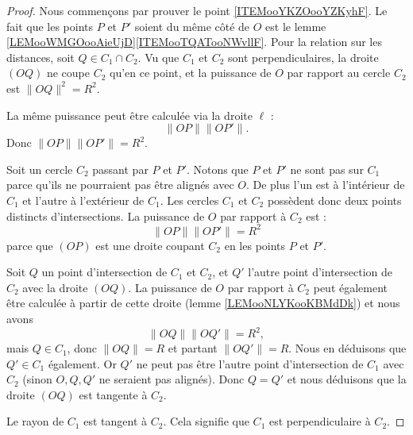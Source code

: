 \begin{proof}
    Nous commençons par prouver le point \ref{ITEMooYKZOooYZKyhF}. Le fait que les points \( P\) et \( P'\) soient du même côté de \( O\) est le lemme \ref{LEMooWMGOooAieUjD}\ref{ITEMooTQATooNWvllF}. Pour la relation sur les distances, soit \( Q\in C_1\cap C_2\). Vu que \( C_1\) et \( C_2\) sont perpendiculaires, la droite \( (OQ)\) ne coupe \( C_2\) qu'en ce point, et la puissance de \( O\) par rapport au cercle \( C_2\) est \( \| OQ \|^2=R^2\).

    La même puissance peut être calculée via la droite \( \ell\) :
    \begin{equation}
        \| OP \|\| OP' \|.
    \end{equation}
    Donc \( \| OP \|\| OP' \|=R^2\).

    Soit un cercle \( C_2\) passant par \( P\) et \( P'\). Notons que \( P\) et \( P'\) ne sont pas sur \( C_1\) parce qu'ils ne pourraient pas être alignés avec \( O\). De plus l'un est à l'intérieur de \( C_1\) et l'autre à l'extérieur de \( C_1\). Les cercles \( C_1\) et \( C_2\) possèdent donc deux points distincts d'intersections.
    La puissance de \( O\) par rapport à \( C_2\) est :
    \begin{equation}
        \| OP \|\| OP' \|=R^2
    \end{equation}
    parce que \( (OP)\) est une droite coupant \( C_2\) en les points \( P\) et \( P'\).

    Soit \( Q\) un point d'intersection de \( C_1\) et \( C_2\), et \( Q'\) l'autre point d'intersection de \( C_2\) avec la droite \( (OQ)\). La puissance de \( O\) par rapport à \( C_2\) peut également être calculée à partir de cette droite (lemme \ref{LEMooNLYKooKBMdDk}) et nous avons
    \begin{equation}
        \| OQ \|\| OQ' \|=R^2,
    \end{equation}
    mais \( Q\in C_1\), donc \( \| OQ \|=R\) et partant \( \| OQ' \|=R\). Nous en déduisons que \( Q'\in C_1\) également. Or \( Q'\) ne peut pas être l'autre point d'intersection de \( C_1\) avec \( C_2\) (sinon \( O,Q,Q'\) ne seraient pas alignés). Donc \( Q=Q'\) et nous déduisons que la droite \( (OQ)\) est tangente à \( C_2\).

    Le rayon de \( C_1\) est tangent à \( C_2\). Cela signifie que $C_1$ est perpendiculaire à \( C_2\).
\end{proof}

